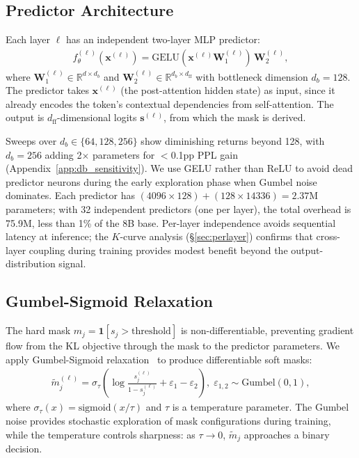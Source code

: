 \subsection{Predictor Architecture}
\label{sec:method:predictor}

Each layer $\ell$ has an independent two-layer MLP predictor:
\begin{align}
f_\theta^{(\ell)}(\mathbf{x}^{(\ell)}) = \text{GELU}(\mathbf{x}^{(\ell)} \mathbf{W}_1^{(\ell)}) \, \mathbf{W}_2^{(\ell)},
\label{eq:predictor}
\end{align}
where $\mathbf{W}_1^{(\ell)} \in \mathbb{R}^{d \times d_b}$ and $\mathbf{W}_2^{(\ell)} \in \mathbb{R}^{d_b \times d_{\text{ff}}}$ with bottleneck dimension $d_b{=}128$.
The predictor takes $\mathbf{x}^{(\ell)}$ (the post-attention hidden state) as input, since it already encodes the token's contextual dependencies from self-attention.
The output is $d_{\text{ff}}$-dimensional logits $\mathbf{s}^{(\ell)}$, from which the mask is derived.

Sweeps over $d_b \in \{64, 128, 256\}$ show diminishing returns beyond 128, with $d_b{=}256$ adding 2$\times$ parameters for $<$0.1pp PPL gain (Appendix~\ref{app:db_sensitivity}).
We use GELU rather than ReLU to avoid dead predictor neurons during the early exploration phase when Gumbel noise dominates.
Each predictor has $(4096 \times 128) + (128 \times 14336) = 2.37\text{M}$ parameters; with 32 independent predictors (one per layer), the total overhead is 75.9M, less than 1\% of the 8B base.
Per-layer independence avoids sequential latency at inference; the $K$-curve analysis (\S\ref{sec:perlayer}) confirms that cross-layer coupling during training provides modest benefit beyond the output-distribution signal.


\subsection{Gumbel-Sigmoid Relaxation}
\label{sec:method:gumbel}

The hard mask $m_j = \mathbf{1}[s_j > \text{threshold}]$ is non-differentiable, preventing gradient flow from the KL objective through the mask to the predictor parameters.
We apply Gumbel-Sigmoid relaxation~\cite{maddison2017concrete,louizos2018l0,jang2017gumbel} to produce differentiable soft masks:
{\small
\begin{align}
\tilde{m}_j^{(\ell)} \!=\! \sigma_\tau\!\left(\!\log \frac{s_j^{(\ell)}}{1 {-} s_j^{(\ell)}} + \varepsilon_1 {-} \varepsilon_2\right)\!,\; \varepsilon_{1,2} {\sim} \text{Gumbel}(0,1),
\label{eq:gumbel}
\end{align}}
where $\sigma_\tau(x) = \text{sigmoid}(x / \tau)$ and $\tau$ is a temperature parameter.
The Gumbel noise provides stochastic exploration of mask configurations during training, while the temperature controls sharpness: as $\tau \to 0$, $\tilde{m}_j$ approaches a binary decision.

